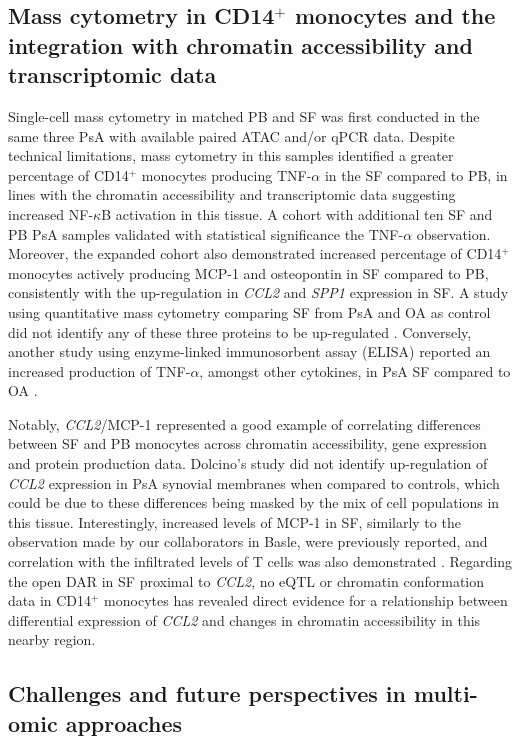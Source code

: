 \subsection{Mass cytometry in CD14$^+$ monocytes and the integration with chromatin accessibility and transcriptomic data}
Single-cell mass cytometry in matched PB and SF was first conducted in the same three PsA with available paired ATAC and/or qPCR data. Despite technical limitations, mass cytometry in this samples identified a greater percentage of CD14$^+$ monocytes producing TNF-$\alpha$ in the SF compared to PB, in lines with the chromatin accessibility and transcriptomic data suggesting increased NF-$\kappa$B activation in this tissue. A cohort with additional ten SF and PB PsA samples validated with statistical significance the TNF-$\alpha$ observation. Moreover, the expanded cohort also demonstrated increased percentage of CD14$^+$ monocytes actively producing MCP-1 and osteopontin in SF compared to PB, consistently with the up-regulation in \textit{CCL2} and \textit{SPP1} expression in SF. A study using quantitative mass cytometry comparing SF from PsA and OA as control did not identify any of these three proteins to be up-regulated \parencite{Cretu2014}. Conversely, another study using enzyme-linked immunosorbent assay (ELISA) reported an increased production of TNF-$\alpha$, amongst other cytokines, in PsA SF compared to OA \parencite{Partsch1997}. 

Notably, \textit{CCL2}/MCP-1 represented a good example of correlating differences between SF and PB monocytes across chromatin accessibility, gene expression and protein production data. Dolcino’s study did not identify up-regulation of \textit{CCL2} expression in PsA synovial membranes when compared to controls, which could be due to these differences being masked by the mix of cell populations in this tissue. Interestingly, increased levels of MCP-1 in SF, similarly to the observation made by our collaborators in Basle, were previously reported, and correlation with the infiltrated levels of T cells was also demonstrated \parencite{Ross2000}. Regarding the open DAR in SF proximal to \textit{CCL2}, no eQTL or chromatin conformation data in CD14$^+$ monocytes has revealed direct evidence for a relationship between differential expression of \textit{CCL2} and changes in chromatin accessibility in this nearby region. 

\subsection{Challenges and future perspectives in multi-omic approaches}
\label{Discussion_scRNAseq}

